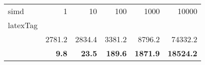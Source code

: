 \begin{tabular}{lrrrrr}
\toprule
simd & 1 & 10 & 100 & 1000 & 10000 \\
latexTag &  &  &  &  &  \\
\midrule
\motionShaSetup{} & 2781.2 & 2834.4 & 3381.2 & 8796.2 & 74332.2 \\
\seecShaSetup{} & \bfseries 9.8 & \bfseries 23.5 & \bfseries 189.6 & \bfseries 1871.9 & \bfseries 18524.2 \\
\bottomrule
\end{tabular}
